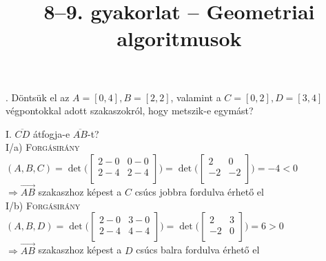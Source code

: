 \documentclass[12pt]{article}
\title{8--9. gyakorlat -- Geometriai algoritmusok}
\begin{document}
\maketitle

. Döntsük el az $A=[0,4], B=[2,2]$, valamint a $C=[0,2], D=[3,4]$ 
végpontokkal adott szakaszokról, hogy metszik-e egymást?


\noindent I. $\overline{CD}$ átfogja-e $\overline{AB}$-t? \\
I/a) {\scshape Forgásirány}$(A,B,C)=\det\Bigg(\begin{bmatrix}
2-0 & 0-0 \\
2-4 & 2-4 \\
\end{bmatrix}\Bigg)=\det\Bigg(\begin{bmatrix}
2  & 0 \\
-2 & -2 \\
\end{bmatrix}\Bigg) = -4 < 0$ \\$\Rightarrow \overrightarrow{AB}$ szakaszhoz 
képest a $C$ csúcs jobbra fordulva érhető el  \\
I/b) {\scshape Forgásirány}$(A,B,D)=\det\Bigg(\begin{bmatrix}
2-0 & 3-0 \\
2-4 & 4-4 \\
\end{bmatrix}\Bigg)=\det\Bigg(\begin{bmatrix}
2  & 3 \\
-2 & 0 \\
\end{bmatrix}\Bigg) = 6 > 0$ \\$\Rightarrow \overrightarrow{AB}$ szakaszhoz 
képest a $D$ csúcs balra fordulva érhető el  \\
\end{document}
